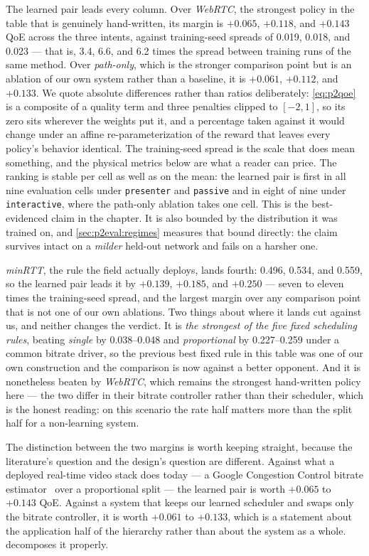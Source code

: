 The learned pair leads every column. Over \emph{WebRTC}, the strongest policy in the table that is
genuinely hand-written, its margin is $+0.065$, $+0.118$, and $+0.143$ QoE across the three intents,
against training-seed spreads of 0.019, 0.018, and 0.023 --- that is, 3.4, 6.6, and 6.2 times the
spread between training runs of the same method. Over \emph{path-only}, which is the stronger
comparison point but is an ablation of our own system rather than a baseline, it is $+0.061$,
$+0.112$, and $+0.133$. We quote absolute differences rather than ratios deliberately:
\cref{eq:p2qoe} is a composite of a quality term and three penalties clipped to $[-2,1]$, so its zero
sits wherever the weights put it, and a percentage taken against it would change under an affine
re-parameterization of the reward that leaves every policy's behavior identical. The training-seed
spread is the scale that does mean something, and the physical metrics below are what a reader can
price. The ranking is stable per cell as well as on the mean:
the learned pair is first in all nine evaluation cells under \texttt{presenter} and \texttt{passive} and
in eight of nine under \texttt{interactive}, where the path-only ablation takes one cell. This is the
best-evidenced claim in the chapter. It is also bounded by the distribution it was trained on, and
\cref{sec:p2eval:regimes} measures that bound directly: the claim survives intact on a \emph{milder}
held-out network and fails on a harsher one.

\emph{minRTT}, the rule the field actually deploys, lands fourth: 0.496, 0.534, and 0.559, so the
learned pair leads it by $+0.139$, $+0.185$, and $+0.250$ --- seven to eleven times the training-seed
spread, and the largest margin over any comparison point that is not one of our own ablations.
Two things about where it lands cut against us, and neither changes the verdict. It is \emph{the strongest of the five fixed scheduling rules}, beating \emph{single} by
0.038--0.048 and \emph{proportional} by 0.227--0.259 under a common bitrate driver, so the previous best
fixed rule in this table was one of our own construction and the comparison is now against a better
opponent. And it is nonetheless beaten by \emph{WebRTC}, which remains the strongest hand-written
policy here --- the two differ in their bitrate controller rather than their scheduler, which is the
honest reading: on this scenario the rate half matters more than the split half for a non-learning
system.

The distinction between the two margins is worth keeping straight, because the literature's question and
the design's question are different. Against what a deployed real-time video stack does today ---
a Google Congestion Control bitrate estimator~\cite{Carlucci2016} over a proportional split --- the
learned pair is worth $+0.065$ to $+0.143$ QoE. Against a system that keeps our learned scheduler and
swaps only the bitrate controller, it is worth $+0.061$ to $+0.133$, which is a statement about the
application half of the hierarchy rather than about the system as a whole.
 decomposes it properly.

